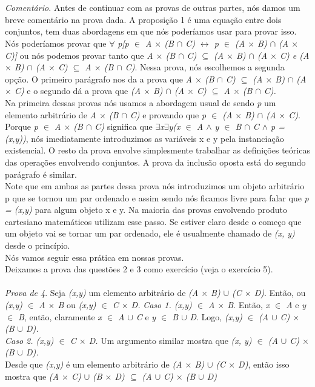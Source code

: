 \\
\\
\textit{Comentário.} Antes de continuar com as provas de outras partes, nós damos um breve comentário na prova dada. A proposição
1 é uma equação entre dois conjuntos, tem duas abordagens em que nós poderíamos usar para provar isso. Nós poderíamos provar que
$\forall$	\textit{p[p $\in$ A $\times$ (B $\cap$ C) $\leftrightarrow$ p $\in$ (A $\times$ B) $\cap$ (A $\times$ C)]} ou nós podemos 
provar tanto que \textit{A $\times$ (B $\cap$ C) $\subseteq$ (A $\times$ B) $\cap$ (A $\times$ C) e (A $\times$ B) $\cap$
(A $\times$ C) $\subseteq$ A $\times$ (B $\cap$ C)}. Nessa prova, nós escolhemos a segunda opção. O primeiro parágrafo nos da 
a prova que \textit{A $\times$ (B $\cap$ C) $\subseteq$ (A $\times$ B) $\cap$ (A $\times$ C)} e o segundo dá a prova que 
\textit{(A $\times$ B) $\cap$ (A $\times$ C) $\subseteq$ A $\times$ (B $\cap$ C).}
\\
Na primeira dessas provas nós usamos a abordagem usual de sendo \textit{p} um elemento arbitrário de \textit{A $\times$ (B $\cap$ C)}
  e provando que \textit{p $\in$ (A $\times$ B) $\cap$ (A $\times$ C)}. Porque \textit{p $\in$ A $\times$ (B $\cap$ C)}
   significa que \textit{$\exists$x$\exists$y(x $\in$ A $\wedge$ y $\in$ B $\cap$ C $\wedge$ p = (x,y))}, nós imediatamente 
   introduzimos as variáveis x e y pela instanciação existencial. O resto da prova envolve simplesmente trabalhar as definições
   teóricas das operações envolvendo conjuntos. A prova da inclusão oposta está do segundo parágrafo é similar.
\\
  Note que em ambas as partes dessa prova nós introduzimos um objeto arbitrário p que se tornou um par ordenado e assim sendo
  nós ficamos livre para falar que \textit{p = (x,y)} para algum objeto x e y. Na maioria das provas envolvendo produto cartesiano
  matemáticos utilizam esse passo. Se estiver claro desde o começo que um objeto vai se tornar um par ordenado, ele é usualmente
  chamado de \textit{(x, y)} desde o princípio.
\\ Nós vamos seguir essa prática em nossas provas.
\\ Deixamos a prova das questões 2 e 3 como exercício (veja o exercício 5).
\\
\\
\textit{Prova de 4}. Seja \textit{(x,y)} um elemento arbitrário de \textit{(A $\times$ B) $\cup$ (C $\times$ D)}. Então, ou
\textit{(x,y) $\in$ A $\times$ B} ou \textit{(x,y) $\in$ C $\times$ D.}
\textit{Caso 1. (x,y) $\in$ A $\times$ B}. Então, \textit{x $\in$ A} e \textit{y $\in$ B}, então, claramente \textit{x $\in$ A $\cup$
C} e \textit{y $\in$ B $\cup$ D}. Logo, \textit{(x,y) $\in$ (A $\cup$ C) $\times$ (B $\cup$ D).}
\\
  \textit{Caso 2. (x,y) $\in$ C $\times$ D.} Um argumento similar mostra que \textit{(x, y) $\in$ (A $\cup$ C) $\times$ 
  (B $\cup$ D).}
\\
  Desde que \textit{(x,y)} é um elemento arbitrário de \textit{(A $\times$ B) $\cup$ (C $\times$ D)}, então isso mostra que
  \textit{(A $\times$ C) $\cup$ (B $\times$ D) $\subseteq$ (A $\cup$ C) $\times$ (B $\cup$ D)}


  